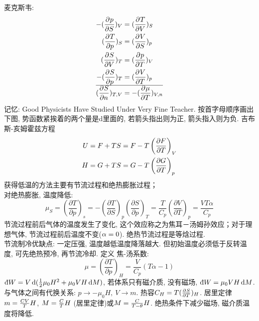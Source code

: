 \documentclass[UTF8,9pt]{ctexart}
\newcommand{\q}[1]{{\color{red} #1}}
\begin{document}
麦克斯韦:
$$\begin{aligned} 
		-(\frac{\partial^{} p}{\partial {S}^{}})_V &= (\frac{\partial^{} T}{\partial {V}^{}})_S\\
		(\frac{\partial^{} T}{\partial {p}^{}})_S &= (\frac{\partial^{} V}{\partial {S}^{}})_p\\
		(\frac{\partial^{} S}{\partial {V}^{}})_T &= (\frac{\partial^{} p}{\partial {T}^{}})_V\\
		-(\frac{\partial^{} S}{\partial {p}^{}})_T &= (\frac{\partial^{} V}{\partial {T}^{}})_p\\
		\hline
		(\frac{\partial^{} S}{\partial {n}^{}})_{T,V} &= -(\frac{\partial^{} \mu}{\partial {T}^{}})_{V,n}
	 \end{aligned}$$
记忆: Good Physicists Have Studied Under Very Fine Teacher. 按首字母顺序画出下图, 势函数紧挨着的两个量是d里面的, 若箭头指出则为正, 箭头指入则为负.
\q{吉布斯-亥姆霍兹方程}
$$\begin{aligned} 
		U=F+TS &=  F-T\left(\frac{\partial F}{\partial T}\right)_{V}\\
		H=G+TS &=  G-T\left(\frac{\partial G}{\partial T}\right)_{p}
	 \end{aligned}$$
获得低温的方法主要有节流过程和绝热膨胀过程；\\
对绝热膨胀, 温度降低:
$$
	\mu_{S}=\left(\frac{\partial T}{\partial p}\right)_{s}=-\left(\frac{\partial T}{\partial S}\right)_{p}\left(\frac{\partial S}{\partial p}\right)_{T}=\frac{T}{C_{p}}\left(\frac{\partial V}{\partial T}\right)_{p}=\frac{V T \alpha}{C_{p}}
$$
节流过程前后气体的温度发生了变化, 这个效应称之为焦耳－汤姆孙效应；对于理想气体, 节流过程前后温度不变($\alpha=0$). \q{绝热节流过程是等焓过程}.\\
节流制冷优缺点: 一定压强, 温度越低温度降落越大. 但初始温度必须低于反转温度, 可先绝热预冷, 再节流冷却.
定义\q{焦-汤系数}:
$$
	\mu=(\frac{\partial T}{\partial p})_{H}= \frac{V}{C_{p}}(T \alpha-1)
$$
$\dbar W=V\d(\ff{2}{\mu_0H^2}+\mu_0VH\d M)$, 若体系只有磁介质, 没有磁场, $\dbar W=\mu_0VH\d M$. 与气体之间有代换关系: \q{$p \rightarrow -\mu_0H,\ V\rightarrow m$}. 热容$C_H=T(\frac{\partial^{} S}{\partial {T}^{}})_H$. 居里定律$m=\frac{CV}{T}H$, $M=\frac{C}{T}H$ (居里定律)或$M=\frac{C}{T-\theta}H$. 绝热条件下减少磁场, 磁介质温度将降低.
\end{document}
